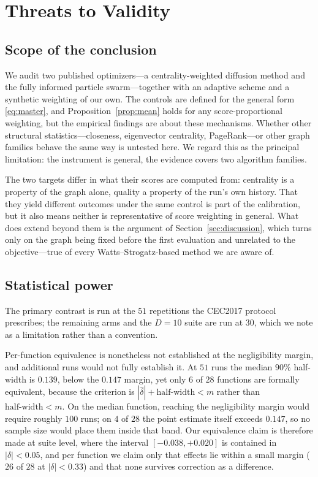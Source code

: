 \section{Threats to Validity}
\label{sec:threats}

\subsection{Scope of the conclusion}

We audit two published optimizers---a centrality-weighted diffusion method and
the fully informed particle swarm---together with an adaptive scheme and a
synthetic weighting of our own. The controls are defined for the general form
\eqref{eq:master}, and Proposition~\ref{prop:mean} holds for any
score-proportional weighting, but the empirical findings are about these
mechanisms. Whether other structural statistics---closeness, eigenvector
centrality, PageRank---or other graph families behave the same way is untested
here. We regard this as the principal limitation: the instrument is general,
the evidence covers two algorithm families.

The two targets differ in what their scores are computed from: centrality is a
property of the graph alone, quality a property of the run's own history. That
they yield different outcomes under the same control is part of the
calibration, but it also means neither is representative of score weighting in
general. What does extend beyond them is the argument of
Section~\ref{sec:discussion}, which turns only on the graph being fixed before
the first evaluation and unrelated to the objective---true of every
Watts--Strogatz-based method we are aware of.

\subsection{Statistical power}

The primary contrast is run at the $51$ repetitions the CEC2017 protocol
prescribes; the remaining arms and the $D=10$ suite are run at $30$, which we
note as a limitation rather than a convention.

Per-function equivalence is nonetheless not established at the negligibility
margin, and additional runs would not fully establish it. At $51$ runs the
median $90\%$ half-width is $0.139$, below the $0.147$ margin, yet only $6$ of
$28$ functions are formally equivalent, because the criterion is
$|\hat{\delta}|+\text{half-width}<m$ rather than $\text{half-width}<m$. On the
median function, reaching the negligibility margin would require roughly $100$
runs; on $4$ of $28$ the point estimate itself exceeds $0.147$, so no sample
size would place them inside that band. Our equivalence claim is therefore made
at suite level, where the interval $[-0.038,+0.020]$ is contained in
$|\delta|<0.05$, and per function we claim only that effects lie within a small
margin ($26$ of $28$ at $|\delta|<0.33$) and that none survives correction as a
difference.

